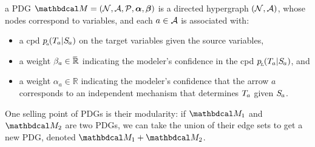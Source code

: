 \documentclass[twoside]{article}
\begin{document}
\begin{defn}
    a PDG $\dg M = (\N, \Ar, \mathcal P, \balpha, \bbeta )
    $
    is a directed hypergraph  $(\mathcal N, \mathcal A)$, whose nodes correspond to
    variables, and 
    each $a \in \mathcal A$ is associated with:
    \begin{itemize}[itemsep=0pt]
        \item a cpd $p\ssub a (\Tgt a | \Src a)$ on the target variables given the source variables,
        \item a weight $\beta_a \in \mskip1mu\overline{\mskip-1mu\mathbb R\!}\,$ indicating 
            the modeler's confidence in the cpd $p\ssub L(\Tgt a | \Src a)$, and 
        \item a weight $\alpha_a \in \mathbb R$ indicating 
            the modeler's confidence that the arrow $a$ corresponds to an independent mechanism that determines $\Tgt a$ given $\Src a$. 
        \qedhere
    \end{itemize}
\end{defn}

One selling point of PDGs is their modularity: if $\dg M_1$ and $\dg M_2$ are two PDGs, we can take the union of their edge sets to get a new PDG, denoted $\dg M_1 + \dg M_2$. 

\TODO[intuition]
\end{document}
